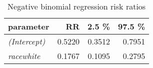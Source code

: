 \begin{wraptable}{r}{2.5in}

\caption{\label{tab:neg_bin_reg_RR}Negative binomial regression risk ratios}
\centering
\fontsize{9}{11}\selectfont
\begin{tabular}[t]{>{}lrrr}
\toprule
parameter & RR & 2.5 \% & 97.5 \%\\
\midrule
\em{(Intercept)} & 0.5220 & 0.3512 & 0.7951\\
\em{racewhite} & 0.1767 & 0.1095 & 0.2795\\
\bottomrule
\end{tabular}
\end{wraptable}
